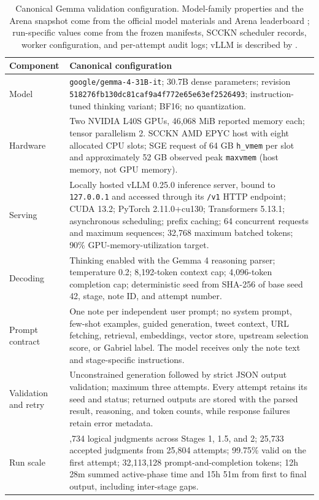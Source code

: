 \documentclass[10pt,twocolumn]{article}
\begin{document}
\begin{table}[ht]
\centering
\small
\begin{tabularx}{\textwidth}{@{}p{2.7cm}>{\raggedright\arraybackslash}X@{}}
\toprule
\textbf{Component} & \textbf{Canonical configuration} \\
\midrule
Model & \texttt{google/gemma-4-31B-it}; 30.7B dense parameters; revision
\texttt{518276fb130dc81caf9a4f772e65e63ef2526493}; instruction-tuned thinking
variant; BF16; no quantization. \\
Hardware & Two NVIDIA L40S GPUs, 46,068 MiB reported memory each; tensor
parallelism 2. SCCKN AMD EPYC host with eight allocated CPU slots; SGE request
of 64 GB \texttt{h\_vmem} per slot and approximately 52 GB observed peak
\texttt{maxvmem} (host memory, not GPU memory). \\
Serving & Locally hosted vLLM 0.25.0 inference server, bound to
\texttt{127.0.0.1} and accessed through its \texttt{/v1} HTTP endpoint; CUDA
13.2; PyTorch 2.11.0+cu130; Transformers 5.13.1; asynchronous scheduling;
prefix caching; 64 concurrent requests and maximum sequences; 32,768 maximum
batched tokens; 90\% GPU-memory-utilization target. \\
Decoding & Thinking enabled with the Gemma 4 reasoning parser; temperature
0.2; 8,192-token context cap; 4,096-token completion cap; deterministic seed
from SHA-256 of base seed 42, stage, note ID, and attempt number. \\
Prompt contract & One note per independent user prompt; no system prompt,
few-shot examples, guided generation, tweet context, URL fetching, retrieval,
embeddings, vector store, upstream selection score, or Gabriel label. The model
receives only the note text and stage-specific instructions. \\
Validation and retry & Unconstrained generation followed by strict JSON output
validation; maximum three attempts. Every attempt retains its seed and status;
returned outputs are stored with the parsed result, reasoning, and token counts,
while response failures retain error metadata. \\
Run scale & 25,734 logical judgments across Stages 1, 1.5, and 2; 25,733
accepted judgments from 25,804 attempts; 99.75\% valid on the first attempt;
32,113,128 prompt-and-completion tokens; 12h 28m summed active-phase time and
15h 51m from first to final output, including inter-stage gaps. \\
\bottomrule
\end{tabularx}
\caption{Canonical Gemma validation configuration. Model-family properties and
the Arena snapshot come from the official model materials and Arena
leaderboard \citep{arena2026leaderboard,google2026gemma4,google2026gemma4card};
run-specific values come from the frozen manifests, SCCKN scheduler records,
worker configuration, and per-attempt audit logs; vLLM is described by
\citet{kwon2023vllm}.}
\label{tab:gemma-runtime}
\end{table}
\end{document}
